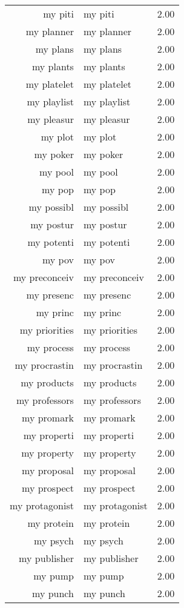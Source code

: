 \begin{table}[ht]
\begin{tabular}{rlr}
  my piti & my piti & 2.00 \\ 
  my planner & my planner & 2.00 \\ 
  my plans & my plans & 2.00 \\ 
  my plants & my plants & 2.00 \\ 
  my platelet & my platelet & 2.00 \\ 
  my playlist & my playlist & 2.00 \\ 
  my pleasur & my pleasur & 2.00 \\ 
  my plot & my plot & 2.00 \\ 
  my poker & my poker & 2.00 \\ 
  my pool & my pool & 2.00 \\ 
  my pop & my pop & 2.00 \\ 
  my possibl & my possibl & 2.00 \\ 
  my postur & my postur & 2.00 \\ 
  my potenti & my potenti & 2.00 \\ 
  my pov & my pov & 2.00 \\ 
  my preconceiv & my preconceiv & 2.00 \\ 
  my presenc & my presenc & 2.00 \\ 
  my princ & my princ & 2.00 \\ 
  my priorities & my priorities & 2.00 \\ 
  my process & my process & 2.00 \\ 
  my procrastin & my procrastin & 2.00 \\ 
  my products & my products & 2.00 \\ 
  my professors & my professors & 2.00 \\ 
  my promark & my promark & 2.00 \\ 
  my properti & my properti & 2.00 \\ 
  my property & my property & 2.00 \\ 
  my proposal & my proposal & 2.00 \\ 
  my prospect & my prospect & 2.00 \\ 
  my protagonist & my protagonist & 2.00 \\ 
  my protein & my protein & 2.00 \\ 
  my psych & my psych & 2.00 \\ 
  my publisher & my publisher & 2.00 \\ 
  my pump & my pump & 2.00 \\ 
  my punch & my punch & 2.00 \\ 

\end{tabular}
\end{table}
